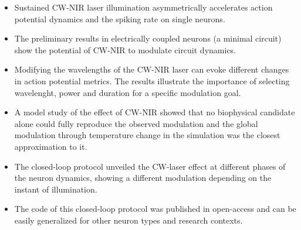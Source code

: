 \begin{itemize}
     \begin{itemize}
         \item Sustained CW-NIR laser illumination asymmetrically accelerates action potential dynamics and the spiking rate on single neurons.
         \item The preliminary results in electrically coupled neurons (a minimal circuit) show the potential of CW-NIR to modulate circuit dynamics.
         \item    Modifying the wavelengths of the CW-NIR laser can evoke different changes in action potential metrics. The results illustrate the importance of selecting  wavelenght, power and duration for a specific modulation goal.
         \item A model study of the effect of CW-NIR showed that no biophysical candidate alone could fully reproduce the observed modulation and the global modulation through temperature change in the simulation was the closest approximation to it.
         \item The closed-loop protocol unveiled the CW-laser effect at different phases of the neuron dynamics, showing a different modulation depending on the instant of illumination.
         \item The code of this closed-loop protocol was published in open-access and can be easily generalized for other neuron types and research contexts.
     \end{itemize}
\end{itemize}
